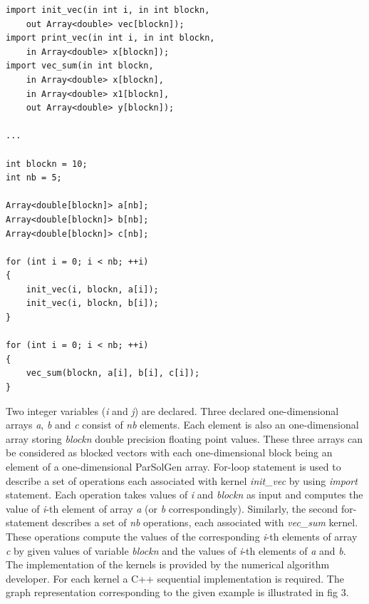 \documentclass[conference]{IEEEtran}
\begin{document}
\begin{lstlisting}[frame=single]
import init_vec(in int i, in int blockn,
	out Array<double> vec[blockn]);
import print_vec(in int i, in int blockn,
	in Array<double> x[blockn]);
import vec_sum(in int blockn,
	in Array<double> x[blockn],
	in Array<double> x1[blockn],
	out Array<double> y[blockn]);

...

int blockn = 10;
int nb = 5;

Array<double[blockn]> a[nb];
Array<double[blockn]> b[nb];
Array<double[blockn]> c[nb];

for (int i = 0; i < nb; ++i)
{
	init_vec(i, blockn, a[i]);
	init_vec(i, blockn, b[i]);
}

for (int i = 0; i < nb; ++i)
{
	vec_sum(blockn, a[i], b[i], c[i]);
}
\end{lstlisting}

Two integer variables (\textit{i} and \textit{j}) are declared. Three declared one-dimensional arrays \textit{a}, \textit{b} and \textit{c} 
consist of \textit{nb} elements. Each element is also an one-dimensional array storing \textit{blockn} double 
precision floating point values. These three arrays can be considered as blocked vectors with each one-dimensional 
block being an element of a one-dimensional ParSolGen array. 
For-loop statement is used to describe a set of operations 
each associated with kernel \textit{init\_vec} by using \textit{import} statement. Each operation takes values of 
\textit{i} and \textit{blockn} as input and computes the value of \textit{i}-th element of array \textit{a} (or 
\textit{b} correspondingly). Similarly, the second for-statement describes a set of \textit{nb} operations, each 
associated with \textit{vec\_sum} kernel. These operations compute the values of the corresponding \textit{i}-th 
elements of array \textit{c} by given values of variable \textit{blockn} and the values of \textit{i}-th elements of
\textit{a} and \textit{b}. The implementation of the kernels is provided by the numerical algorithm developer. For 
each kernel a C++ sequential implementation is required. The graph representation corresponding to the given example 
is illustrated in fig 3.
\end{document}
